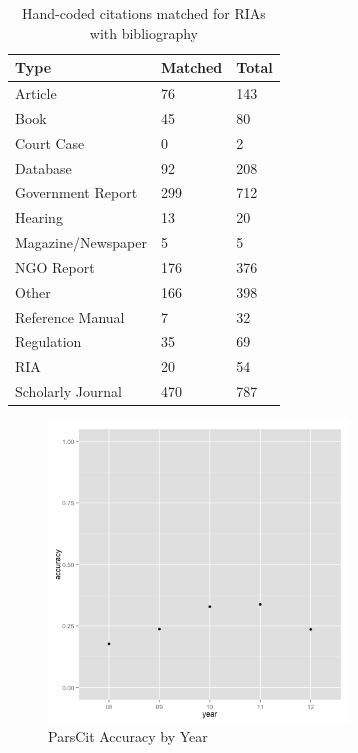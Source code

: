 \documentclass[12pt]{article}
\begin{document}
\begin{table}[ht]
\centering
\caption{Hand-coded citations matched for RIAs with bibliography}\label{tab:bibtypes}
\begin{tabular}{lll}
  \hline
  \hline
 Type & Matched & Total\\
 \hline
Article & 76 & 143 \\
Book & 45 & 80\\
Court Case & 0 & 2\\
Database & 92 & 208 \\
Government Report & 299 & 712 \\
Hearing & 13 & 20\\
Magazine/Newspaper & 5 & 5\\
NGO Report & 176 & 376 \\
Other & 166 & 398 \\
Reference Manual & 7 &  32\\
Regulation & 35 & 69 \\
RIA & 20 & 54\\
Scholarly Journal & 470 & 787\\
  \hline
  \hline
\end{tabular}
\end{table}

\begin{figure}
\begin{center}
\includegraphics[height=8cm]{yearly_accuracy.png}
\caption{ParsCit Accuracy by Year}
\label{fig:yearlyaccuracy}
\end{center}
\end{figure}
\end{document}
